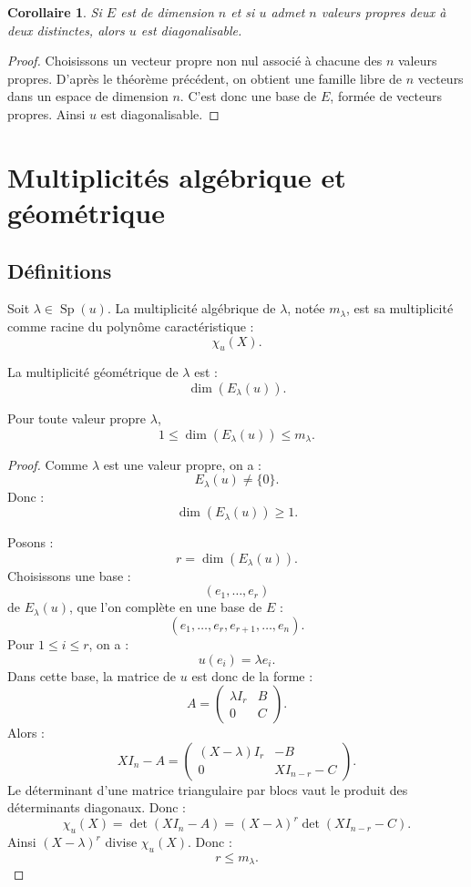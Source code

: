 \documentclass[11pt,a4paper]{article}
\newcommand{\Sp}{\operatorname{Sp}}
\newtheorem{corollaire}[prop]{Corollaire}
\begin{document}
\begin{corollaire}
Si \(E\) est de dimension \(n\) et si \(u\) admet \(n\) valeurs propres deux à deux distinctes, alors \(u\) est diagonalisable.
\end{corollaire}

\begin{proof}
Choisissons un vecteur propre non nul associé à chacune des \(n\) valeurs propres.  
D'après le théorème précédent, on obtient une famille libre de \(n\) vecteurs dans un espace de dimension \(n\).  
C'est donc une base de \(E\), formée de vecteurs propres.  
Ainsi \(u\) est diagonalisable.
\end{proof}

\section{Multiplicités algébrique et géométrique}

\subsection{Définitions}

\begin{definitionbox}
Soit \(\lambda\in\Sp(u)\).  
La multiplicité algébrique de \(\lambda\), notée \(m_\lambda\), est sa multiplicité comme racine du polynôme caractéristique :
\[
\chi_u(X).
\]
\end{definitionbox}

\begin{definitionbox}
La multiplicité géométrique de \(\lambda\) est :
\[
\dim(E_\lambda(u)).
\]
\end{definitionbox}

\begin{theorembox}
Pour toute valeur propre \(\lambda\),
\[
1\leq \dim(E_\lambda(u))\leq m_\lambda.
\]
\end{theorembox}

\begin{proof}
Comme \(\lambda\) est une valeur propre, on a :
\[
E_\lambda(u)\neq\{0\}.
\]
Donc :
\[
\dim(E_\lambda(u))\geq1.
\]

Posons :
\[
r=\dim(E_\lambda(u)).
\]
Choisissons une base :
\[
(e_1,\dots,e_r)
\]
de \(E_\lambda(u)\), que l'on complète en une base de \(E\) :
\[
(e_1,\dots,e_r,e_{r+1},\dots,e_n).
\]
Pour \(1\leq i\leq r\), on a :
\[
u(e_i)=\lambda e_i.
\]
Dans cette base, la matrice de \(u\) est donc de la forme :
\[
A=
\begin{pmatrix}
\lambda I_r & B\\
0 & C
\end{pmatrix}.
\]
Alors :
\[
XI_n-A=
\begin{pmatrix}
(X-\lambda)I_r & -B\\
0 & XI_{n-r}-C
\end{pmatrix}.
\]
Le déterminant d'une matrice triangulaire par blocs vaut le produit des déterminants diagonaux. Donc :
\[
\chi_u(X)
=
\det(XI_n-A)
=
(X-\lambda)^r\det(XI_{n-r}-C).
\]
Ainsi \((X-\lambda)^r\) divise \(\chi_u(X)\).  
Donc :
\[
r\leq m_\lambda.
\]
\end{proof}
\end{document}
